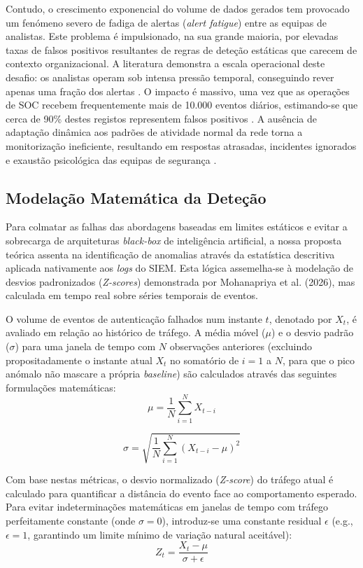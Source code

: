 \documentclass[12pt,a4paper]{article}
\begin{document}
Contudo, o crescimento exponencial do volume de dados gerados tem provocado um fenómeno severo de fadiga de alertas (\textit{alert fatigue}) entre as equipas de analistas. Este problema é impulsionado, na sua grande maioria, por elevadas taxas de falsos positivos resultantes de regras de deteção estáticas que carecem de contexto organizacional. A literatura demonstra a escala operacional deste desafio: os analistas operam sob intensa pressão temporal, conseguindo rever apenas uma fração dos alertas \cite{rieger2026, roy2026}. O impacto é massivo, uma vez que as operações de SOC recebem frequentemente mais de 10.000 eventos diários, estimando-se que cerca de 90\% destes registos representem falsos positivos \cite{yauri2026}. A ausência de adaptação dinâmica aos padrões de atividade normal da rede torna a monitorização ineficiente, resultando em respostas atrasadas, incidentes ignorados e exaustão psicológica das equipas de segurança \cite{rieger2026}.

\subsection{Modelação Matemática da Deteção}
Para colmatar as falhas das abordagens baseadas em limites estáticos e evitar a sobrecarga de arquiteturas \textit{black-box} de inteligência artificial, a nossa proposta teórica assenta na identificação de anomalias através da estatística descritiva aplicada nativamente aos \textit{logs} do SIEM. Esta lógica assemelha-se à modelação de desvios padronizados (\textit{Z-scores}) demonstrada por Mohanapriya et al. (2026), mas calculada em tempo real sobre séries temporais de eventos.

O volume de eventos de autenticação falhados num instante $t$, denotado por $X_t$, é avaliado em relação ao histórico de tráfego. A média móvel ($\mu$) e o desvio padrão ($\sigma$) para uma janela de tempo com $N$ observações anteriores (excluindo propositadamente o instante atual $X_t$ no somatório de $i=1$ a $N$, para que o pico anómalo não mascare a própria \textit{baseline}) são calculados através das seguintes formulações matemáticas:
\begin{equation}
    \mu = \frac{1}{N} \sum_{i=1}^{N} X_{t-i}
\end{equation}

\begin{equation}
    \sigma = \sqrt{\frac{1}{N} \sum_{i=1}^{N} (X_{t-i} - \mu)^2}
\end{equation}

Com base nestas métricas, o desvio normalizado (\textit{Z-score}) do tráfego atual é calculado para quantificar a distância do evento face ao comportamento esperado. Para evitar indeterminações matemáticas em janelas de tempo com tráfego perfeitamente constante (onde $\sigma = 0$), introduz-se uma constante residual $\epsilon$ (e.g., $\epsilon = 1$, garantindo um limite mínimo de variação natural aceitável):
\begin{equation}
    Z_t = \frac{X_t - \mu}{\sigma + \epsilon}
\end{equation}
\end{document}
